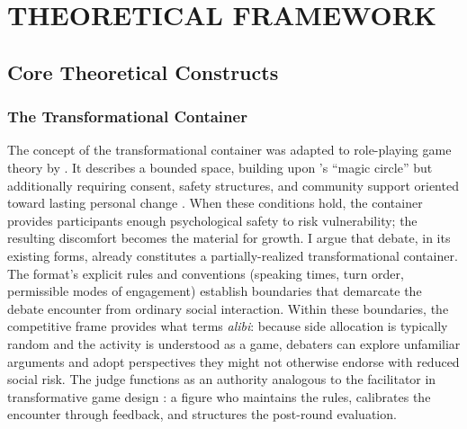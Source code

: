 \section{THEORETICAL FRAMEWORK}
\label{sec:theory}

\subsection{Core Theoretical Constructs}

\subsubsection{The Transformational Container}

The concept of the transformational container was adapted to role-playing game theory by \textcite{bowman2021magic}. It describes a bounded space, building upon \textcite{huizinga1958homo}'s ``magic circle'' but additionally requiring consent, safety structures, and community support oriented toward lasting personal change \parencite{bowman2021magic, baird2022transformative, bowman2025transformative}. When these conditions hold, the container provides participants enough psychological safety to risk vulnerability; the resulting discomfort becomes the material for growth. I argue that debate, in its existing forms, already constitutes a partially-realized transformational container. The format's explicit rules and conventions (speaking times, turn order, permissible modes of engagement) establish boundaries that demarcate the debate encounter from ordinary social interaction. Within these boundaries, the competitive frame provides what \textcite{deterding2017alibis} terms \textit{alibi}: because side allocation is typically random and the activity is understood as a game, debaters can explore unfamiliar arguments and adopt perspectives they might not otherwise endorse with reduced social risk. The judge functions as an authority analogous to the facilitator in transformative game design \parencite{bowman2025transformative}: a figure who maintains the rules, calibrates the encounter through feedback, and structures the post-round evaluation.


